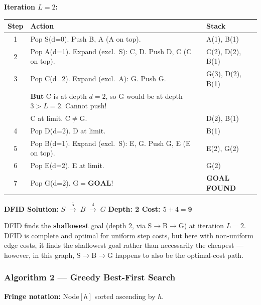 \documentclass[12pt, a4paper]{article}
\newenvironment{answerbox}{\begin{mdframed}[style=answerframe]}{\end{mdframed}}
\newcommand{\goal}{\textcolor{green!55!black}{\textbf{GOAL FOUND}}}
\begin{document}
\noindent\textbf{Iteration $L = 2$:}
\begin{center}
\renewcommand{\arraystretch}{1.2}
\begin{tabular}{c|l|p{8.5cm}}
\toprule
\textbf{Step} & \textbf{Action} & \textbf{Stack} \\
\midrule
1 & Pop S(d=0). Push B, A (A on top). & A(1), B(1) \\
2 & Pop A(d=1). Expand (excl.\ S): C, D. Push D, C (C on top). & C(2), D(2), B(1) \\
3 & Pop C(d=2). Expand (excl.\ A): G. Push G. & G(3), D(2), B(1) \\
  & \textbf{But} C is at depth $d{=}2$, so G would be at depth $3 > L{=}2$. Cannot push! & \\
  & C at limit. $\mathrm{C} \neq \mathrm{G}$. & D(2), B(1) \\
4 & Pop D(d=2). D at limit. & B(1) \\
5 & Pop B(d=1). Expand (excl.\ S): E, G. Push G, E (E on top). & E(2), G(2) \\
6 & Pop E(d=2). E at limit. & G(2) \\
7 & Pop G(d=2). $\mathrm{G} = \textbf{GOAL!}$ & \goal \\
\bottomrule
\end{tabular}
\end{center}

\begin{answerbox}
\textbf{DFID Solution:} $S \;\xrightarrow{5}\; B \;\xrightarrow{4}\; G$
\hfill \textbf{Depth: 2 \quad Cost: $5+4 = \mathbf{9}$}

DFID finds the \textbf{shallowest} goal (depth 2, via S$\to$B$\to$G) at iteration $L=2$. DFID is complete and optimal for uniform step costs, but here with non-uniform edge costs, it finds the shallowest goal rather than necessarily the cheapest — however, in this graph, S$\to$B$\to$G happens to also be the optimal-cost path.
\end{answerbox}

\vspace{1em}

\subsubsection*{Algorithm 2 — Greedy Best-First Search}

\textbf{Fringe notation:} Node$[h]$ sorted ascending by $h$.
\end{document}
